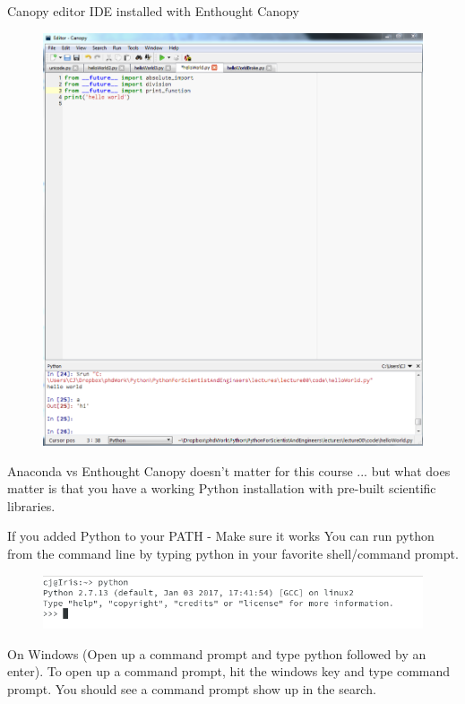 \documentclass[10pt]{beamer}
\begin{document}
\begin{frame}{Canopy editor IDE installed with Enthought Canopy}
          \begin{figure} 	
 	\includegraphics[width=.75\textwidth]{figs/canopy.png}
      \end{figure}
\end{frame}


\begin{frame}{Anaconda vs Enthought Canopy doesn't matter for this course}
... but what does matter is that you have a working Python installation with pre-built scientific libraries.
\end{frame}

\begin{frame}{If you added Python to your PATH - Make sure it works}
You can run python from the command line by typing python in your favorite shell/command prompt.

\begin{figure}
 	\includegraphics[width=1.0\textwidth]{figs/pythonLinux.png}
\end{figure}

On Windows (Open up a command prompt and type python followed by an enter). To open up a command prompt, hit the windows key and type command prompt. You should see a command prompt show up in the search.

\end{frame}
\end{document}
